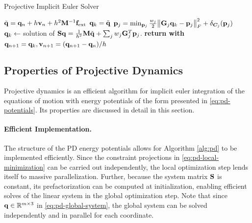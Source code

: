 \begin{algorithm}
\caption{Projective Implicit Euler Solver}\label{alg:pd}
\begin{algorithmic}
\State $\tilde{\mathbf{q}} = \mathbf{q}_n + h\mathbf{v}_n + h^2\mathbf{M}^{-1}\mathbf{f}_{\text{ext}}$
\State $\mathbf{q}_k = \tilde{\mathbf{q}}$
\State $\mathbf{p}_j = \min_{\mathbf{p}_j} \frac{w_j}{2}\norm{\mathbf{G}_j\mathbf{q}_k - \mathbf{p}_j}^2_F + \delta_{\bm{C}_j}(\mathbf{p}_j)$
\EndFor
\State $\mathbf{q}_{k} \gets$ solution of $\mathbf{S}\mathbf{q} = \frac{1}{h^2}\mathbf{M}\tilde{\mathbf{q}} + \sum_j w_j \mathbf{G}_j^T \mathbf{p}_j$.
\EndFor
\State \textbf{return with } $\mathbf{q}_{n+1} = \mathbf{q}_k, \mathbf{v}_{n+1} = (\mathbf{q}_{n+1} - \mathbf{q}_n) / h$
\EndProcedure
\end{algorithmic}
\end{algorithm}

\subsection{Properties of Projective Dynamics}\label{ss:pd-properties}
Projective dynamics is an efficient algorithm for implicit euler integration of the equations of motion with energy potentials of the form 
presented in \autoref{eq:pd-potentials}. Its properties are discussed in detail in this section.

\paragraph{Efficient Implementation.}
The structure of the PD energy potentials allows for Algorithm \ref{alg:pd} to be implemented efficiently. Since the constraint projections
in \autoref{eq:pd-local-minimization} can be carried out independently, the local optimization step lends itself to massive parallelization. 
Further, because the system matrix $\mathbf{S}$ is constant, its prefactorization can be computed at initialization, enabling
efficient solves of the linear system in the global optimization step. Note that since $\mathbf{q} \in \mathbb{R}^{m \times 3}$ in \autoref{eq:pd-global-system}, 
the global system can be solved independently and in parallel for each coordinate.

